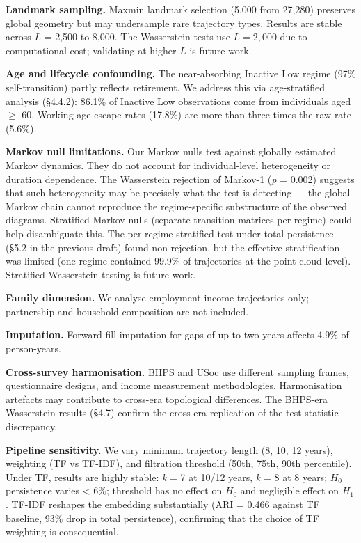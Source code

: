 \textbf{Landmark sampling.} Maxmin landmark selection (5,000 from 27,280) preserves global geometry but may undersample rare trajectory types. Results are stable across $L$ = 2,500 to 8,000. The Wasserstein tests use $L = 2{,}000$ due to computational cost; validating at higher $L$ is future work.

\textbf{Age and lifecycle confounding.} The near-absorbing Inactive Low regime (97\% self-transition) partly reflects retirement. We address this via age-stratified analysis (\S4.4.2): 86.1\% of Inactive Low observations come from individuals aged $\geq$ 60. Working-age escape rates (17.8\%) are more than three times the raw rate (5.6\%).

\textbf{Markov null limitations.} Our Markov nulls test against globally estimated Markov dynamics. They do not account for individual-level heterogeneity or duration dependence. The Wasserstein rejection of Markov-1 (\textit{p} = 0.002) suggests that such heterogeneity may be precisely what the test is detecting --- the global Markov chain cannot reproduce the regime-specific substructure of the observed diagrams. Stratified Markov nulls (separate transition matrices per regime) could help disambiguate this. The per-regime stratified test under total persistence (\S5.2 in the previous draft) found non-rejection, but the effective stratification was limited (one regime contained 99.9\% of trajectories at the point-cloud level). Stratified Wasserstein testing is future work.

\textbf{Family dimension.} We analyse employment-income trajectories only; partnership and household composition are not included.

\textbf{Imputation.} Forward-fill imputation for gaps of up to two years affects 4.9\% of person-years.

\textbf{Cross-survey harmonisation.} BHPS and USoc use different sampling frames, questionnaire designs, and income measurement methodologies. Harmonisation artefacts may contribute to cross-era topological differences. The BHPS-era Wasserstein results (\S4.7) confirm the cross-era replication of the test-statistic discrepancy.

\textbf{Pipeline sensitivity.} We vary minimum trajectory length (8, 10, 12 years), weighting (TF vs TF-IDF), and filtration threshold (50th, 75th, 90th percentile). Under TF, results are highly stable: \textit{k} = 7 at 10/12 years, \textit{k} = 8 at 8 years; $H_0$ persistence varies < 6\%; threshold has no effect on $H_0$ and negligible effect on $H_1$. TF-IDF reshapes the embedding substantially (ARI = 0.466 against TF baseline, 93\% drop in total persistence), confirming that the choice of TF weighting is consequential.


